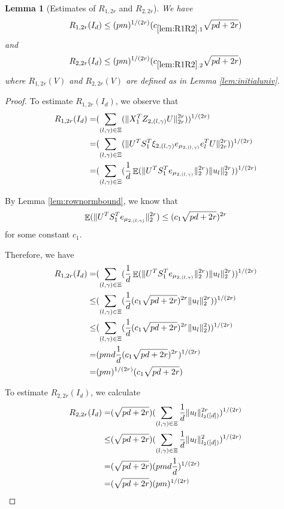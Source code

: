 \documentclass[11pt]{amsart}
\numberwithin{equation}{section}
\numberwithin{equation}{section}
\DeclareMathOperator{\E}{\mathbb{E}}
\DeclarePairedDelimiter{\norm}{\lVert}{\rVert}
\newtheorem{lemma}[theorem]{Lemma}
\begin{document}
\begin{lemma}[Estimates of $R_{1,2r}$ and $R_{2,2r}$]\label{lem:R1R2}
We have
\begin{align*}
    R_{1,2r}(I_d) \le (pm)^{1/(2r)}(c_{\ref{lem:R1R2}.1}\sqrt{pd+2r})
\end{align*}
and
\begin{align*}
    R_{2,2r}(I_d) \le (pm)^{1/(2r)}(c_{\ref{lem:R1R2}.2}\sqrt{pd+2r})
\end{align*}
where $R_{1,2r}(V)$ and $R_{2,2r}(V)$ are defined as in Lemma \ref{lem:initialuniv}.
\end{lemma}

\begin{proof}
To estimate $R_{1,2r}(I_d)$, we observe that
\begin{align*}
    R_{1,2r}(I_d)=&(\sum\limits_{(l,\gamma) \in \Xi}(\norm{X_1^TZ_{2,(l,\gamma)}U}_{2r}^{2r}))^{1/(2r)}
    \\=&(\sum\limits_{(l,\gamma) \in \Xi}(\norm{U^TS_1^T\xi_{2,(l,\gamma)}e_{\mu_{2,(l,\gamma)}}e_l^TU}_{2r}^{2r}))^{1/(2r)}
    \\=&(\sum\limits_{(l,\gamma) \in \Xi}(\frac{1}{d}\E(\norm{U^TS_1^Te_{\mu_{2,(l,\gamma)}}}_2^{2r})\norm{u_l}_2^{2r}))^{1/(2r)}
\end{align*}

By Lemma \ref{lem:rownormbound}, we know that
\begin{align*}
    \E(\norm{U^TS_1^Te_{\mu_{2,(l,\gamma)}}}_2^{2r}) \le (c_1\sqrt{pd+2r})^{2r}
\end{align*}
for some constant $c_1$.

Therefore, we have
\begin{align*}
    R_{1,2r}(I_d)
    =&(\sum\limits_{(l,\gamma) \in \Xi}(\frac{1}{d}\E(\norm{U^TS_1^Te_{\mu_{2,(l,\gamma)}}}_2^{2r})\norm{u_l}_2^{2r}))^{1/(2r)}
    \\ \le & (\sum\limits_{(l,\gamma) \in \Xi}(\frac{1}{d}(c_1\sqrt{pd+2r})^{2r}\norm{u_l}_2^{2r}))^{1/(2r)}
    \\ \le & (\sum\limits_{(l,\gamma) \in \Xi}(\frac{1}{d}(c_1\sqrt{pd+2r})^{2r}\norm{u_l}_2^{2}))^{1/(2r)}
    \\=& (pmd\frac{1}{d}(c_1\sqrt{pd+2r})^{2r})^{1/(2r)}
    \\=& (pm)^{1/(2r)}(c_1\sqrt{pd+2r})
\end{align*}

To estimate $R_{2,2r}(I_d)$, we calculate
\begin{align*}
    R_{2,2r}(I_d)=&(\sqrt{pd+2r}) (\sum\limits_{(l,\gamma) \in \Xi}\frac{1}{d}\norm{u_l}_{l_2([d])}^{2r})^{1/(2r)}
    \\ \le & (\sqrt{pd+2r}) (\sum\limits_{(l,\gamma) \in \Xi}\frac{1}{d}\norm{u_l}_{l_2([d])}^{2})^{1/(2r)}
    \\ = & (\sqrt{pd+2r}) (pmd\frac{1}{d})^{1/(2r)}
    \\ = & (\sqrt{pd+2r}) (pm)^{1/(2r)}
\end{align*}

\end{proof}
\end{document}
